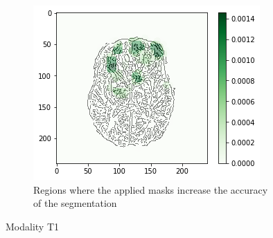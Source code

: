 \begin{figure}[H]
    \begin{subfigure}[t]{.45\textwidth}
        \centering
        \includegraphics[width=\linewidth]{chapters/06_hdm/c_Brats18_2013_17_1_L1/44.png}
        \caption{Regions where the applied masks increase the accuracy of the segmentation}
    \end{subfigure}
    \caption{Modality T1}
    \label{brats_201317_t1}
\end{figure}

